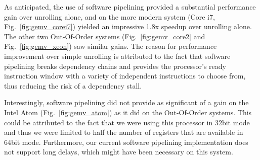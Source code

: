 \documentclass[10pt]{article}
\begin{document}

As anticipated, the use of software pipelining provided a substantial
performance gain over unrolling alone, and on the more modern system (Core i7,
Fig.~\ref{fig:gemv_corei7}) yielded an impressive 1.8x speedup over unrolling
alone. The other two Out-Of-Order systems (Fig.~\ref{fig:gemv_core2} and
Fig.~\ref{fig:gemv_xeon}) saw similar gains. The reason for performance
improvement over simple unrolling is attributed to the fact that software
pipelining breaks dependency chains and provides the processor's ready
instruction window with a variety of independent instructions to choose from,
thus reducing the risk of a dependency stall.


Interestingly, software pipelining did not provide as significant of a gain on
the Intel Atom (Fig.~\ref{fig:gemv_atom}) as it did on the Out-Of-Order
systems. This could be attributed to the fact that we were using this
processor in 32bit mode and thus we were limited to half the number of
registers that are available in 64bit mode. Furthermore, our current software
pipelining implementation does not support long delays, which might have been
necessary on this system.
\end{document}

